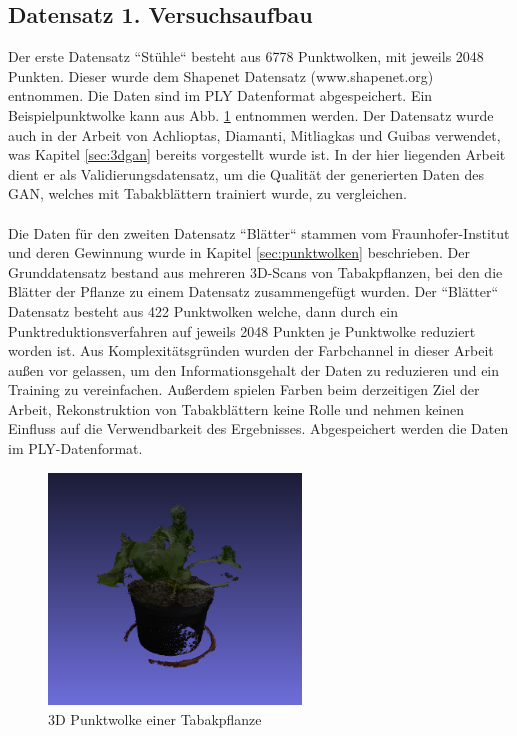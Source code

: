 \documentclass{llncs}
\begin{document}
\subsection{Datensatz 1. Versuchsaufbau}\label{sec:versuch1-traingsdaten}

Der erste Datensatz ``Stühle`` besteht aus 6778 Punktwolken, mit jeweils 2048 Punkten. Dieser wurde dem Shapenet Datensatz (www.shapenet.org) entnommen. Die Daten sind im PLY Datenformat abgespeichert. Ein Beispielpunktwolke kann aus Abb. \ref{fig:Bild50} entnommen werden. Der Datensatz wurde auch in der Arbeit von Achlioptas, Diamanti, Mitliagkas und Guibas \cite{3dgan} verwendet, was Kapitel \ref{sec:3dgan} bereits vorgestellt wurde ist. In der hier liegenden Arbeit dient er als Validierungsdatensatz, um die Qualität der generierten Daten des GAN, welches mit Tabakblättern trainiert wurde, zu vergleichen.
\\\\
Die Daten für den zweiten Datensatz ``Blätter`` stammen vom Fraunhofer-Institut und deren Gewinnung wurde in Kapitel \ref{sec:punktwolken} beschrieben. Der Grunddatensatz bestand aus mehreren 3D-Scans von Tabakpflanzen, bei den die Blätter der Pflanze zu einem Datensatz zusammengefügt wurden. Der ``Blätter`` Datensatz besteht aus 422 Punktwolken welche, dann durch ein Punktreduktionsverfahren auf jeweils 2048 Punkten je Punktwolke reduziert worden ist. Aus Komplexitätsgründen wurden der Farbchannel in dieser Arbeit außen vor gelassen, um den Informationsgehalt der Daten zu reduzieren und ein Training zu vereinfachen. Außerdem spielen Farben beim derzeitigen Ziel der Arbeit, Rekonstruktion von Tabakblättern keine Rolle und nehmen keinen Einfluss auf die Verwendbarkeit des Ergebnisses. Abgespeichert werden die Daten im PLY-Datenformat.

\begin{figure}[htbp] 
	\centering
	\includegraphics[width=0.6\textwidth]{plant.png}
	\caption{3D Punktwolke einer Tabakpflanze}
	\label{fig:Bild50}
\end{figure}
\end{document}
